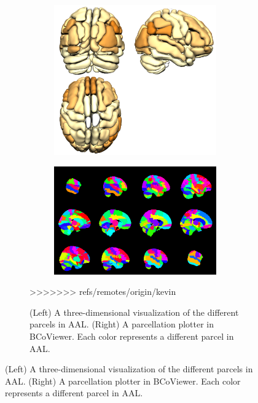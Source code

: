 \documentclass{nature}
\begin{document}
{\begin{figure}[tb]
\begin{figure}
\centering
\begin{subfigure}{.5\textwidth}
  \centering
  \includegraphics[width=.9\linewidth]{fig/brainconductor/AAL_all.png}
\end{subfigure}%
\begin{subfigure}{.5\textwidth}
  \centering
 
\includegraphics[width=.9\linewidth]{fig/brainconductor/partition_aal_sagittal_2016-04-11.png}
\end{subfigure}
\caption{(Left) A three-dimensional visualization of the different parcels in
AAL. (Right) A parcellation plotter in BCoViewer. Each color represents a
different parcel in AAL.}
\label{fig:aal}
>>>>>>> refs/remotes/origin/kevin
\end{figure}


\end{figure}}
\end{document}
